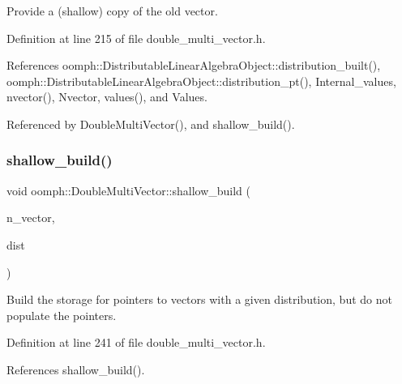 Provide a (shallow) copy of the old vector. 



Definition at line 215 of file double\+\_\+multi\+\_\+vector.\+h.



References oomph\+::\+Distributable\+Linear\+Algebra\+Object\+::distribution\+\_\+built(), oomph\+::\+Distributable\+Linear\+Algebra\+Object\+::distribution\+\_\+pt(), Internal\+\_\+values, nvector(), Nvector, values(), and Values.



Referenced by Double\+Multi\+Vector(), and shallow\+\_\+build().

\mbox{\label{classoomph_1_1DoubleMultiVector_a2e870d0ff926823ec177b2c5bd1cdd0b}} 
\subsubsection{\texorpdfstring{shallow\+\_\+build()}{shallow\_build()}\hspace{0.1cm}{\footnotesize\ttfamily [2/3]}}
{\footnotesize\ttfamily void oomph\+::\+Double\+Multi\+Vector\+::shallow\+\_\+build (\begin{DoxyParamCaption}\item[{const unsigned \&}]{n\+\_\+vector,  }\item[{const \hyperlink{classoomph_1_1LinearAlgebraDistribution}{Linear\+Algebra\+Distribution} \&}]{dist }\end{DoxyParamCaption})\hspace{0.3cm}{\ttfamily [inline]}}



Build the storage for pointers to vectors with a given distribution, but do not populate the pointers. 



Definition at line 241 of file double\+\_\+multi\+\_\+vector.\+h.



References shallow\+\_\+build().

\mbox{\label{classoomph_1_1DoubleMultiVector_acd1ee1d155838e203a95fc70cdc1552c}} 
